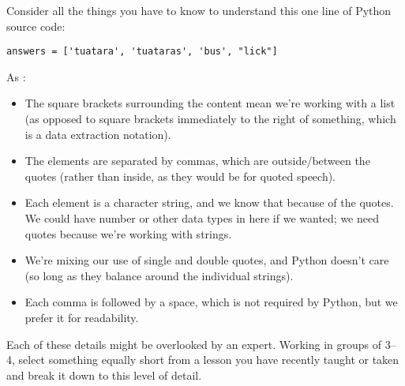 Consider all the things you have to know to understand this one line of
Python source code:

\begin{verbatim}
answers = ['tuatara', 'tuataras', 'bus', "lick"]
\end{verbatim}

As :

\begin{itemize}
\item
  The square brackets surrounding the content mean we're working with
  a list (as opposed to square brackets immediately to the right of
  something, which is a data extraction notation).
\item
  The elements are separated by commas, which are outside/between the
  quotes (rather than inside, as they would be for quoted speech).
\item
  Each element is a character string, and we know that because of the
  quotes. We could have number or other data types in here if we
  wanted; we need quotes because we're working with strings.
\item
  We're mixing our use of single and double quotes, and Python doesn't
  care (so long as they balance around the individual strings).
\item
  Each comma is followed by a space, which is not required by Python,
  but we prefer it for readability.
\end{itemize}

Each of these details might be overlooked by an expert. Working in
groups of 3--4, select something equally short from a lesson you have
recently taught or taken and break it down to this level of detail.
